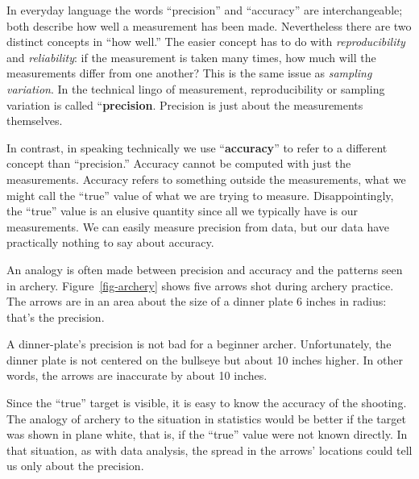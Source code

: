 \documentclass[
  letterpaper,
  DIV=11,
  numbers=noendperiod,
  oneside]{scrartcl}
\begin{document}
In everyday language the words ``precision'' and ``accuracy'' are
interchangeable; both describe how well a measurement has been made.
Nevertheless there are two distinct concepts in ``how well.'' The easier
concept has to do with \emph{reproducibility} and \emph{reliability}: if
the measurement is taken many times, how much will the measurements
differ from one another? This is the same issue as \emph{sampling
variation}. In the technical lingo of measurement, reproducibility or
sampling variation is called ``\textbf{precision}. Precision is just
about the measurements themselves.

In contrast, in speaking technically we use ``\textbf{accuracy}'' to
refer to a different concept than ``precision.'' Accuracy cannot be
computed with just the measurements. Accuracy refers to something
outside the measurements, what we might call the ``true'' value of what
we are trying to measure. Disappointingly, the ``true'' value is an
elusive quantity since all we typically have is our measurements. We can
easily measure precision from data, but our data have practically
nothing to say about accuracy.

An analogy is often made between precision and accuracy and the patterns
seen in archery. Figure~\ref{fig-archery} shows five arrows shot during
archery practice. The arrows are in an area about the size of a dinner
plate 6 inches in radius: that's the precision.

\begin{figure}



\end{figure}%

A dinner-plate's precision is not bad for a beginner archer.
Unfortunately, the dinner plate is not centered on the bullseye but
about 10 inches higher. In other words, the arrows are inaccurate by
about 10 inches.

Since the ``true'' target is visible, it is easy to know the accuracy of
the shooting. The analogy of archery to the situation in statistics
would be better if the target was shown in plane white, that is, if the
``true'' value were not known directly. In that situation, as with data
analysis, the spread in the arrows' locations could tell us only about
the precision.
\end{document}
